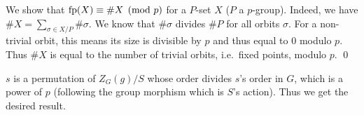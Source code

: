     We show that ${\rm fp}(X)\equiv\#X\pmod p$ for a $P$-set $X$ ($P$ a $p$-group).
    Indeed, we have $\#X=\sum_{\sigma\in X/P}\#\sigma$.
    We know that $\#\sigma$ divides $\#P$ for all orbits $\sigma$.
    For a non-trivial orbit, this means its size is divisible by $p$ and thus equal to $0$ modulo $p$.
    Thus $\#X$ is equal to the number of trivial orbits, i.e.\ fixed points, modulo $p$.
    \qed

\eproof

$s$ is a permutation of $Z_G(g)/S$ whose order divides $s$'s order in $G$, which is a power of $p$ (following the group morphism which is $S$'s action).
Thus we get the desired result.

